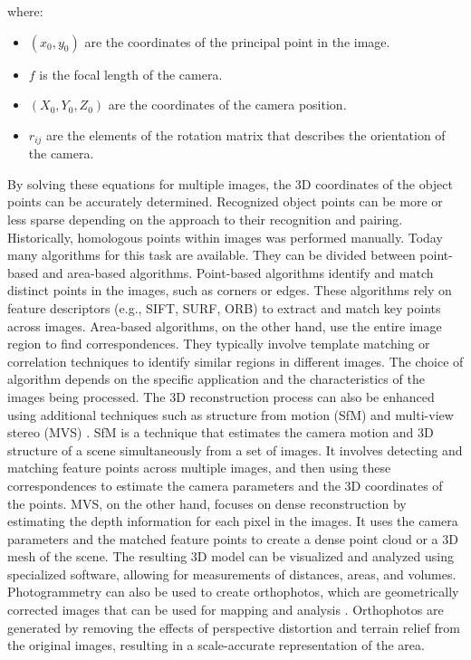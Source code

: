 \documentclass[12pt,a4paper,oneside]{report}
\begin{document}
where:
\begin{itemize}
    \item \( (x_0, y_0) \) are the coordinates of the principal point in the image.
    \item \( f \) is the focal length of the camera.
    \item \( (X_0, Y_0, Z_0) \) are the coordinates of the camera position.
    \item \( r_{ij} \) are the elements of the rotation matrix that describes the orientation of the camera.
\end{itemize}

By solving these equations for multiple images, the 3D coordinates of the object 
points can be accurately determined.
Recognized object points can be more or less sparse depending on the approach to 
their recognition and pairing. 
Historically, homologous points within images was
performed manually. Today many algorithms for this task are available. 
They can be divided between point-based and area-based algorithms.
Point-based algorithms identify and match distinct points in the images, such as
corners or edges. These algorithms rely on feature descriptors (e.g., SIFT, SURF, ORB)
\cite{loweDistinctiveImageFeatures2004,baySpeededUpRobustFeatures2008,rubleeORBEfficientAlternative2011}
to extract and match key points across images. Area-based algorithms, on the other hand,
use the entire image region to find correspondences. They typically involve
template matching or correlation techniques to identify similar regions in different images.
The choice of algorithm depends on the specific application and the characteristics
of the images being processed.
The 3D reconstruction process can also be enhanced using additional techniques such as
structure from motion (SfM) and multi-view stereo (MVS)
\cite{westobyStructurefromMotionPhotogrammetryLowcost2012,seitzComparisonEvaluationMultiView2006}. 
SfM is a technique that
estimates the camera motion and 3D structure of a scene simultaneously from a
set of images. It involves detecting and matching feature points across multiple images,
and then using these correspondences to estimate the camera parameters and the 3D
coordinates of the points. MVS, on the other hand, focuses on dense reconstruction
by estimating the depth information for each pixel in the images. It uses the camera
parameters and the matched feature points to create a dense point cloud or a 3D mesh
of the scene.
The resulting 3D model can be visualized and analyzed using specialized software,
allowing for measurements of distances, areas, and volumes. Photogrammetry can also
be used to create orthophotos, which are geometrically corrected images that can be
used for mapping and analysis
\cite{mikhailIntroductionModernPhotogrammetry2001,paineAerialPhotographyImage2012}. 
Orthophotos are generated by removing the effects of
perspective distortion and terrain relief from the original images, resulting in a
scale-accurate representation of the area.
\end{document}
